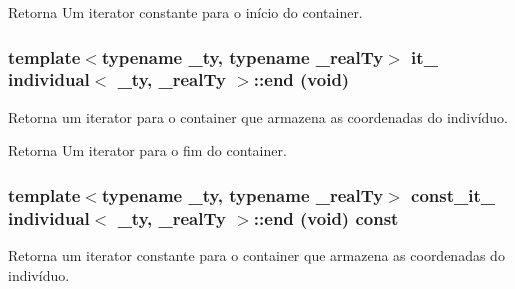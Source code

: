 \begin{DoxyReturn}{Retorna}
Um iterator constante para o início do container. 
\end{DoxyReturn}
\hypertarget{classindividual_a101b20b621ef6cf681ba210247c937d5}{
\subsubsection[{end}]{\setlength{\rightskip}{0pt plus 5cm}template$<$typename \_\-ty, typename \_\-realTy$>$ {\bf it\_\-} {\bf individual}$<$ \_\-ty, \_\-realTy $>$::end (void)}}
\label{classindividual_a101b20b621ef6cf681ba210247c937d5}
Retorna um iterator para o container que armazena as coordenadas do indivíduo.

\begin{DoxyReturn}{Retorna}
Um iterator para o fim do container. 
\end{DoxyReturn}
\hypertarget{classindividual_af2c60e6a02eae91c9f1b419a11067bdb}{
\subsubsection[{end}]{\setlength{\rightskip}{0pt plus 5cm}template$<$typename \_\-ty, typename \_\-realTy$>$ {\bf const\_\-it\_\-} {\bf individual}$<$ \_\-ty, \_\-realTy $>$::end (void) const}}
\label{classindividual_af2c60e6a02eae91c9f1b419a11067bdb}
Retorna um iterator constante para o container que armazena as coordenadas do indivíduo.

